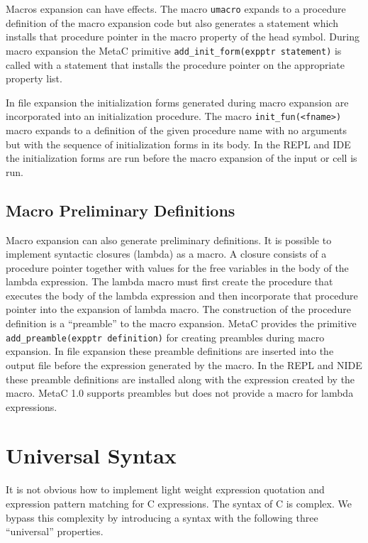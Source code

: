 \documentclass{article}
\begin{document}
Macros expansion can have effects.  The macro {\tt umacro} expands to a procedure definition of the macro expansion code but also
generates a statement which installs that procedure pointer in the macro property of the head symbol.  During macro expansion the
MetaC primitive {\tt add\_init\_form(expptr statement)} is called with a statement that installs the procedure pointer on the appropriate property list.

In file expansion the initialization forms generated during macro expansion are incorporated into an initialization procedure.
The macro {\tt init\_fun(<fname>)} macro expands to a definition of the given procedure name with no arguments but with the sequence
of initialization forms in its body.  In the REPL and IDE the initialization forms are run before the macro expansion of the input or cell is run.

\subsection{Macro Preliminary Definitions}

Macro expansion can also generate preliminary definitions.  It is possible to implement syntactic closures (lambda) as a macro.
A closure consists of a procedure pointer together with values for the free variables in the body of the lambda expression.  The lambda
macro must first create the procedure that executes the body of the lambda expression and then incorporate that procedure pointer into
the expansion of lambda macro.  The construction of the procedure definition is a ``preamble'' to the macro expansion.
MetaC provides the primitive {\tt add\_preamble(expptr definition)} for creating preambles during macro expansion.
In file expansion these preamble definitions are inserted into the output file before the
expression generated by the macro.  In the REPL and NIDE these preamble definitions are installed along with the expression created by the macro.
MetaC 1.0 supports preambles but does not provide a macro for lambda expressions.

\section{Universal Syntax}

It is not obvious how to implement light weight expression quotation and expression pattern matching for C expressions.  The syntax of C is complex.
We bypass this complexity by introducing a syntax with the following three ``universal'' properties.
\end{document}
